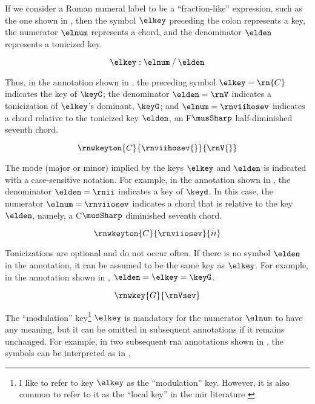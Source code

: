 
If we consider a Roman numeral label to be a
``fraction-like'' expression, such as the one shown in
, then the symbol $\elkey$ preceding
the colon represents a key, the numerator $\elnum$
represents a chord, and the denominator $\elden$ represents
a tonicized key.

\begin{equation}
    \label{eq:rn_expression}
    \elkey : \elnum \: / \: \elden
\end{equation}

Thus, in the annotation shown in , the
preceding symbol $\elkey=\rn{C}$ indicates the key of
$\keyC$; the denominator $\elden = \rnV$ indicates a
tonicization of $\elkey$'s dominant, $\keyG$; and
$\elnum=\rnviihosev$ indicates a chord relative to the
tonicized key $\elden$, an F$\musSharp$ half-diminished
seventh chord.

\begin{equation}
    \label{eq:rn_example1}
    \rnwkeyton{C}{\rnviihosev{}}{\rnV{}}
\end{equation}


The mode (major or minor) implied by the keys $\elkey$ and
$\elden$ is indicated with a case-sensitive notation. For
example, in the annotation shown in , the
denominator $\elden=\rnii$ indicates a key of $\keyd$. In
this case, the numerator $\elnum = \rnviiosev$ indicates a
chord that is relative to the key $\elden$, namely, a
C$\musSharp$ diminished seventh chord.

\begin{equation}
    \label{eq:rn_example2}
    \rnwkeyton{C}{\rnviiosev}{ii}
\end{equation}

Tonicizations are optional and do not occur often. If there
is no symbol $\elden$ in the annotation, it can be assumed
to be the same key as $\elkey$. For example, in the
annotation shown in , $\elden = \elkey =
\keyG$.

\begin{equation}
    \label{eq:rn_example3}
    \rnwkey{G}{\rnVsev}
\end{equation}

The ``modulation'' key\footnote{I like to refer to key
$\elkey$ as the ``modulation'' key. However, it is also
common to refer to it as the ``local key'' in the \gls{mir}
literature \parencite{napoleslopez2020local}} $\elkey$ is
mandatory for the numerator $\elnum$ to have any meaning,
but it can be omitted in subsequent annotations if it
remains unchanged. For example, in two subsequent \gls{rna}
annotations shown in , the
symbols can be interpreted as in
.

